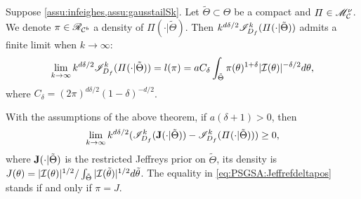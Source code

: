 



\begin{thm}\label{thm:refcompact}
    Suppose \cref{assu:infeighes,assu:gausstailSk}.  %
    Let $\tilde\Theta\subset\Theta$ be a compact and  $\varPi\in\mathscr{M}_{\mathcal{C}}^\nu$. We denote $\pi\in\mathscr{R}_{\mathcal{C}^b}$ a density of $\varPi(\cdot|\tilde\Theta)$.
    Then $k^{d\delta/2}\mathscr{I}^k_{D_f}(\varPi(\cdot|\tilde\Theta))$ admits a finite limit when $k\to\infty$:
    \begin{equation}\label{eq:liml}
        \lim_{k\rightarrow\infty} k^{d\delta/2} \mathscr{I}^k_{D_f}(\varPi(\cdot|\tilde\Theta)) = l(\pi) =
a C_\delta \int_{\tilde\Theta}\pi(\theta)^{1+\delta} |\mathcal{I}(\theta)|^{-\delta/2}  d\theta ,
    \end{equation}
where $ C_\delta = (2\pi)^{d\delta/2} (1-\delta)^{-d/2}$.
\end{thm}

\begin{prop}
    With the assumptions of the above theorem,  if $a(\delta+1)>0$, then
        \begin{equation}\label{eq:PSGSA:Jeffrefdeltapos}
            \lim_{k\rightarrow\infty}k^{d\delta/2}(\mathscr{I}^k_{D_f}(\mathbf{J}(\cdot|\tilde\Theta))-\mathscr{I}_{D_f}^k(\varPi(\cdot|\tilde\Theta)))\geq 0 ,
        \end{equation}
    where $\mathbf{J}(\cdot|\tilde\Theta)$ is the restricted Jeffreys prior on $\tilde\Theta$, its density is $J(\theta) = |\mathcal{I}(\theta)|^{1/2}/\int_{\tilde\Theta}|\mathcal{I}(\tilde\theta)|^{1/2}d\tilde\theta$.
    The equality in \cref{eq:PSGSA:Jeffrefdeltapos} stands if and only if 
    {$\pi=J$}.
\end{prop}



